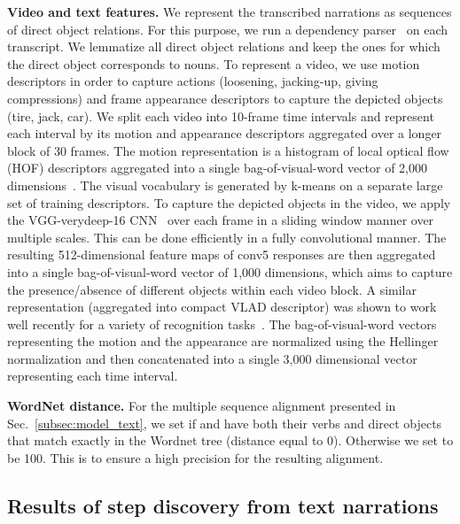 \documentclass[10pt,twocolumn,letterpaper]{article}
\begin{document}
\textbf{Video and text features.} 
We represent the transcribed narrations as sequences of direct object relations. 
For this purpose, we run a dependency parser~\cite{Marneffe06generating} on each transcript. 
We lemmatize all direct object relations and keep the ones for which the direct object corresponds to nouns.
To represent a video, we use motion descriptors in order to capture actions (loosening, jacking-up, giving compressions) and frame appearance descriptors to capture the depicted objects (tire, jack, car). 
We split each video into 10-frame time intervals and represent each interval by its motion and appearance descriptors aggregated over a longer block of 30 frames. The motion representation is a histogram of local optical flow (HOF) descriptors aggregated into a single bag-of-visual-word vector of 2,000 dimensions~\cite{Wang13action}.  The visual vocabulary is generated by k-means on a separate large set of training descriptors.
To capture the depicted objects in the video, we apply the VGG-verydeep-16 CNN~\cite{Simonyan14c} over each frame in a sliding window manner over multiple scales. This can be done efficiently in a fully convolutional manner. The resulting 512-dimensional feature maps of conv5 responses are then aggregated into a single bag-of-visual-word vector of 1,000 dimensions, which aims to capture the presence/absence of different objects within each video block. A similar representation (aggregated into compact VLAD descriptor) was shown to work well recently for a variety of recognition tasks~\cite{Cimpoi15}. The bag-of-visual-word vectors representing the motion and the appearance are normalized using the Hellinger normalization and then concatenated into a single 3,000 dimensional vector representing each time interval.

\textbf{WordNet distance.}
For the multiple sequence alignment presented in Sec.~\ref{subsec:model_text}, we set  if  and  have both their verbs and direct objects that match exactly in the Wordnet tree (distance equal to 0).
Otherwise we set  to be 100.
This is to ensure a high precision for the resulting alignment. 


\subsection{Results of step discovery from text narrations}
\label{sec:step_discovery}
\label{subsec:exp0}
\end{document}
